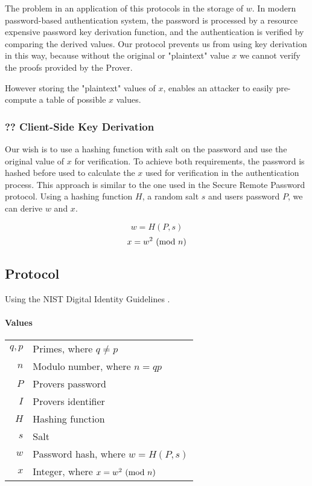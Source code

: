 The problem in an application of this protocols in the storage of $w$.
In modern password-based authentication system, the password is processed by a resource expensive password key derivation function, and the authentication is verified by comparing the derived values.
Our protocol prevents us from using key derivation in this way, because without the original or "plaintext" value $x$ we cannot verify the proofs provided by the Prover.

However storing the "plaintext" values of $x$, enables an attacker to easily pre-compute a table of possible $x$ values.

\subsubsection{?? Client-Side Key Derivation}
Our wish is to use a hashing function with salt on the password and use the original value of $x$ for verification.
To achieve both requirements, the password is hashed before used to calculate the $x$ used for verification in the authentication process.
This approach is similar to the one used in \cite{wu1998secure} the Secure Remote Password protocol.
Using a hashing function $H$, a random salt $s$ and users password $P$, we can derive $w$ and $x$.

$$w = H(P, s)$$
$$x = w^2 \ (\mathrm{mod}\ n)$$

\subsection{Protocol}
Using the NIST Digital Identity Guidelines \cite{grassi2017}.

\paragraph{Values}
\begin{center}
	\begin{tabular}{rl}
		$q, p$ & Primes, where $q \ne p$\\
		$n$ & Modulo number, where $n = qp$\\ %
		$P$ & Provers password \\
		$I$ & Provers identifier \\
		$H$ & Hashing function \\
		$s$	& Salt\\
		$w$ & Password hash, where $w = H(P, s)$\\ %
		$x$ & Integer, where $x = w^2 \ (\mathrm{mod}\ n)$ %
	\end{tabular}
\end{center}


